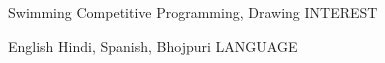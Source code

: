 
\begin{cvhonors}

  \cvhonor
    {Swimming} %
    {Competitive Programming, Drawing} %
    {}
    {INTEREST} %

  \cvhonor
    {English} %
    {Hindi, Spanish, Bhojpuri} %
    {}
    {LANGUAGE} %

\end{cvhonors}